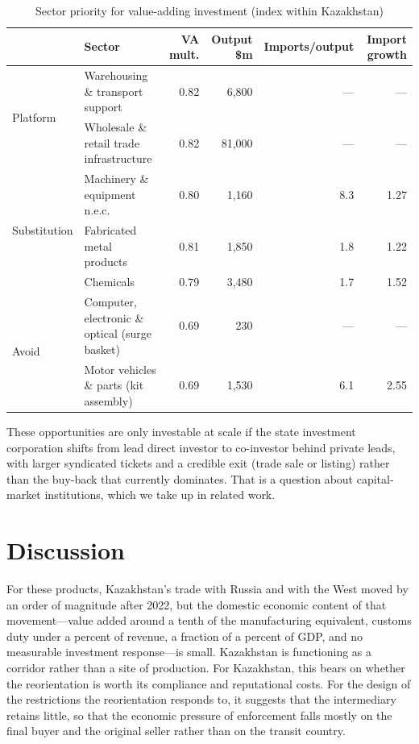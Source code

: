 \documentclass[12pt]{article}
\begin{document}
\begin{table}[t]
\centering
\caption{Sector priority for value-adding investment (index within Kazakhstan)}
\label{tab:priority}
\small
\begin{tabular}{llrrrr}
\toprule
& Sector & VA mult. & Output \$m & Imports/output & Import growth \\
\midrule
\multirow{2}{*}{Platform}
 & Warehousing \& transport support & 0.82 & 6{,}800 & --- & --- \\
 & Wholesale \& retail trade infrastructure & 0.82 & 81{,}000 & --- & --- \\[2pt]
\multirow{3}{*}{Substitution}
 & Machinery \& equipment n.e.c. & 0.80 & 1{,}160 & 8.3 & 1.27 \\
 & Fabricated metal products & 0.81 & 1{,}850 & 1.8 & 1.22 \\
 & Chemicals & 0.79 & 3{,}480 & 1.7 & 1.52 \\[2pt]
\multirow{2}{*}{Avoid}
 & Computer, electronic \& optical (surge basket) & 0.69 & 230 & --- & --- \\
 & Motor vehicles \& parts (kit assembly) & 0.69 & 1{,}530 & 6.1 & 2.55 \\
\bottomrule
\end{tabular}
\end{table}

These opportunities are only investable at scale if the state investment corporation shifts
from lead direct investor to co-investor behind private leads, with larger syndicated tickets
and a credible exit (trade sale or listing) rather than the buy-back that currently dominates.
That is a question about capital-market institutions, which we take up in related work.

\section{Discussion}

For these products, Kazakhstan's trade with Russia and with the West moved by an order of
magnitude after 2022, but the domestic economic content of that movement---value added around
a tenth of the manufacturing equivalent, customs duty under a percent of revenue, a fraction
of a percent of GDP, and no measurable investment response---is small. Kazakhstan is
functioning as a corridor rather than a site of production. For Kazakhstan, this bears on
whether the reorientation is worth its compliance and reputational costs. For the design of
the restrictions the reorientation responds to, it suggests that the intermediary retains
little, so that the economic pressure of enforcement falls mostly on the final buyer and the
original seller rather than on the transit country.
\end{document}
